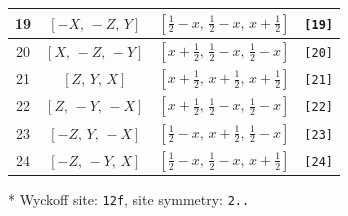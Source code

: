 \documentclass[fleqn,8pt]{jsarticle}
\begin{document}
\begin{longtable}{cccc}
19 & $\left[ - X,\, - Z,\, Y \right]$ & $\left[ \frac{1}{2} - x,\, \frac{1}{2} - x,\, x + \frac{1}{2} \right]$ & {\tt [19]} \\ \hline
20 & $\left[ X,\, - Z,\, - Y \right]$ & $\left[ x + \frac{1}{2},\, \frac{1}{2} - x,\, \frac{1}{2} - x \right]$ & {\tt [20]} \\ \hline
21 & $\left[ Z,\, Y,\, X \right]$ & $\left[ x + \frac{1}{2},\, x + \frac{1}{2},\, x + \frac{1}{2} \right]$ & {\tt [21]} \\ \hline
22 & $\left[ Z,\, - Y,\, - X \right]$ & $\left[ x + \frac{1}{2},\, \frac{1}{2} - x,\, \frac{1}{2} - x \right]$ & {\tt [22]} \\ \hline
23 & $\left[ - Z,\, Y,\, - X \right]$ & $\left[ \frac{1}{2} - x,\, x + \frac{1}{2},\, \frac{1}{2} - x \right]$ & {\tt [23]} \\ \hline
24 & $\left[ - Z,\, - Y,\, X \right]$ & $\left[ \frac{1}{2} - x,\, \frac{1}{2} - x,\, x + \frac{1}{2} \right]$ & {\tt [24]} \\
\end{longtable}
* Wyckoff site: {\tt 12f}, site symmetry: {\tt 2..}
\renewcommand{\arraystretch}{1.2}
\end{document}
